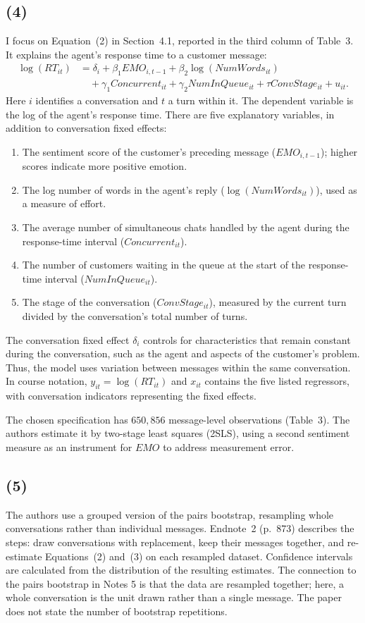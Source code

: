 \documentclass[11pt]{article}
\begin{document}
\subsection{(4)}
I focus on Equation~(2) in Section~4.1, reported in the third column of
Table~3. It explains the agent's response time to a customer message:
\[
\begin{aligned}
\log(RT_{it})
&=\delta_i+\beta_1 EMO_{i,t-1}
  +\beta_2\log(NumWords_{it})\\
&\quad+\gamma_1 Concurrent_{it}+\gamma_2 NumInQueue_{it}
  +\tau ConvStage_{it}+u_{it}.
\end{aligned}
\]
Here $i$ identifies a conversation and $t$ a turn within it. The dependent
variable is the log of the agent's response time. There are five
explanatory variables, in addition to conversation fixed effects:
\begin{enumerate}
\item The sentiment score of the customer's preceding message
($EMO_{i,t-1}$); higher scores indicate more positive emotion.
\item The log number of words in the agent's reply ($\log(NumWords_{it})$),
used as a measure of effort.
\item The average number of simultaneous chats handled by the agent
during the response-time interval ($Concurrent_{it}$).
\item The number of customers waiting in the queue at the start of
the response-time interval ($NumInQueue_{it}$).
\item The stage of the conversation ($ConvStage_{it}$), measured by the
current turn divided by the conversation's total number of turns.
\end{enumerate}
The conversation fixed effect $\delta_i$ controls for characteristics
that remain constant during the conversation, such as the agent and
aspects of the customer's problem. Thus, the model uses variation
between messages within the same conversation. In course notation,
$y_{it}=\log(RT_{it})$ and $x_{it}$ contains the five listed regressors,
with conversation indicators representing the fixed effects.

The chosen specification has $650{,}856$ message-level observations
(Table~3). The authors estimate it by two-stage least squares (2SLS),
using a second sentiment measure as an instrument for $EMO$ to address
measurement error.

\subsection{(5)}
The authors use a grouped version of the pairs bootstrap, resampling
whole conversations rather than individual messages. Endnote~2
(p.~873) describes the steps: draw conversations with replacement,
keep their messages together, and re-estimate Equations~(2) and~(3)
on each resampled dataset. Confidence intervals are calculated from
the distribution of the resulting estimates. The connection to the
pairs bootstrap in Notes 5 is that the data are resampled together;
here, a whole conversation is the unit drawn rather than a single
message. The paper does not state the number of bootstrap repetitions.
\end{document}

